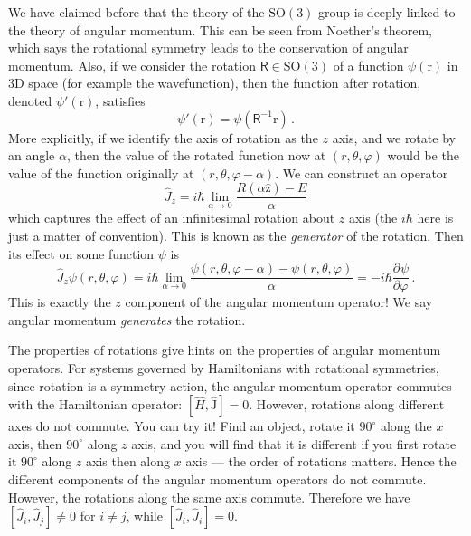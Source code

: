 \documentclass{article}
\theoremstyle{plain}\theoremheaderfont{\normalfont\itshape}\theorembodyfont{\rmfamily}\theoremseparator{.}\newtheorem*{rem}{Remark}\newtheorem*{ex}{Example}\newtheorem*{proof}{Proof}\newtheorem*{altp}{Alternative proof}
\theoremstyle{plain}\theoremheaderfont{\normalfont\bfseries}\theorembodyfont{\rmfamily}\theoremseparator{.}\newtheorem{thm}{Theorem}[section]\newtheorem{lem}[thm]{Lemma}\newtheorem{prop}[thm]{Proposition}\newtheorem*{cor}{Corollary}\newtheorem{defn}[thm]{Definition}\newtheorem{clm}[thm]{Claim}\newtheorem{clminproof}{Claim}\newtheorem*{law}{Law}\newtheorem{pos}[thm]{Postulate}
\theoremstyle{break}\theoremheaderfont{\normalfont\itshape}\theorembodyfont{\rmfamily}\theoremseparator{.\medskip}\newtheorem*{proofskip}{Proof}\newtheorem*{exs}{Examples}\newtheorem*{rems}{Remarks}
\theoremstyle{break}\theoremheaderfont{\normalfont\bfseries}\theorembodyfont{\rmfamily}\theoremseparator{.\medskip}\newtheorem{lemskip}[thm]{Lemma}\newtheorem{defnskip}[thm]{Definition}\newtheorem{propskip}[thm]{Proposition}\newtheorem{thmskip}[thm]{Theorem}
\numberwithin{equation}{section}
\newcommand{\pdv}[3][]{\frac{\partial^{#1} #2}{{\partial #3}^{#1}}}
\newcommand{\vb}[1]{\bm{\mathrm{#1}}}
\newcommand{\vu}[1]{\hat{\bm{\mathrm{#1}}}}
\newcommand{\SO}{\mathrm{SO}}
\begin{document}
    We have claimed before that the theory of the \(\SO(3)\) group is deeply linked to the theory of angular momentum. This can be seen from Noether's theorem, which says the rotational symmetry leads to the conservation of angular momentum. Also, if we consider the rotation \(\mathsf{R}\in\SO(3)\) of a function \(\psi(\vb{r})\) in 3D space (for example the wavefunction), then the function after rotation, denoted \(\psi'(\vb{r})\), satisfies
    \begin{equation}
        \psi'(\vb{r})=\psi(\mathsf{R}^{-1}\vb{r})\,.
    \end{equation}
    More explicitly, if we identify the axis of rotation as the \(z\) axis, and we rotate by an angle \(\alpha\), then the value of the rotated function now at \((r,\theta,\varphi)\) would be the value of the function originally at \((r,\theta,\varphi-\alpha)\). We can construct an operator
    \begin{equation}\label{J_generates_rotation}
        \hat{J}_z=i\hbar\lim_{\alpha\to 0}\frac{R(\alpha\vu{z})-E}{\alpha}
    \end{equation}
    which captures the effect of an infinitesimal rotation about \(z\) axis (the \(i\hbar\) here is just a matter of convention). This is known as the \textit{generator} of the rotation. Then its effect on some function \(\psi\) is
    \begin{equation}
        \hat{J}_z\psi(r,\theta,\varphi)=i\hbar\lim_{\alpha\to 0}\frac{\psi(r,\theta,\varphi-\alpha)-\psi(r,\theta,\varphi)}{\alpha}=-i\hbar\pdv{\psi}{\varphi}\,.
    \end{equation}
    This is exactly the \(z\) component of the angular momentum operator! We say angular momentum \textit{generates} the rotation.

    The properties of rotations give hints on the properties of angular momentum operators. For systems governed by Hamiltonians with rotational symmetries, since rotation is a symmetry action, the angular momentum operator commutes with the Hamiltonian operator: \([\hat{H},\hat{\vb{J}}]=0\). However, rotations along different axes do not commute. You can try it! Find an object, rotate it \(90^\circ\) along the \(x\) axis, then \(90^\circ\) along \(z\) axis, and you will find that it is different if you first rotate it \(90^\circ\) along \(z\) axis then along \(x\) axis --- the order of rotations matters. Hence the different components of the angular momentum operators do not commute. However, the rotations along the same axis commute. Therefore we have \([\hat{J}_i,\hat{J}_j]\ne 0\) for \(i\ne j\), while \([\hat{J}_i,\hat{J}_i]=0\).
    
\end{document}
